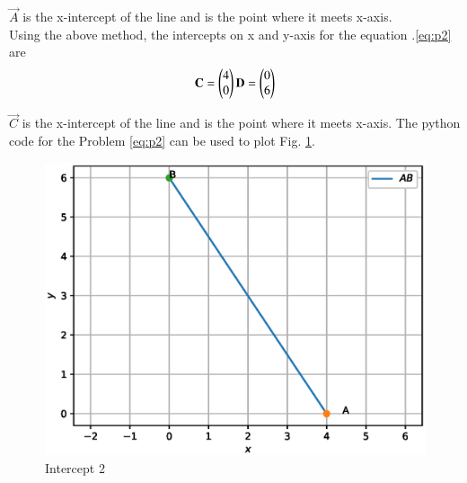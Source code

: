 \begin{enumerate}[label=\arabic*.,ref=\thesubsection.\theenumi]
\label{eq:p1xaxis}
$\vec{A}$ is the x-intercept of the line and is the point where it meets x-axis.
\\
Using the above method, the intercepts on x and y-axis for the equation .\eqref{eq:p2} are
\begin{align}
\mathbf{C} = \begin{pmatrix}4\\0\end{pmatrix}
\mathbf{D} = \begin{pmatrix}0\\6\end{pmatrix}
\end{align}

\label{eq:p2xaxis}
$\vec{C}$ is the x-intercept of the line and is the point where it meets x-axis.
The python code for the Problem \eqref{eq:p2}
%
can be used to plot Fig. \ref{fig:intercept2}.
%
\begin{figure}[!ht]
\includegraphics[width=\columnwidth]{./figs/triangle/icept2.eps}
\caption{Intercept 2}
\label{fig:intercept2}
\end{figure}


\end{enumerate}

